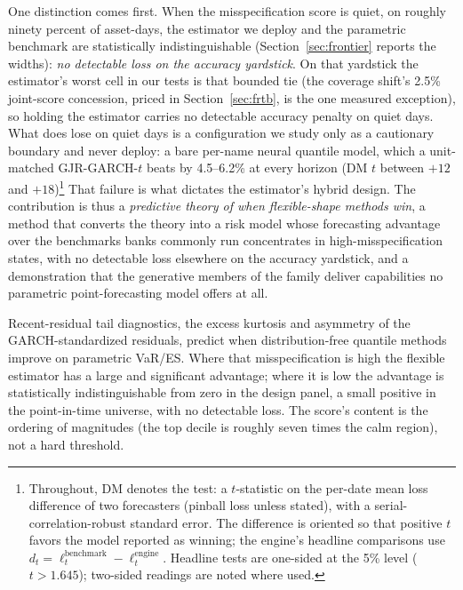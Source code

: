 \documentclass[11pt]{article}
\theoremstyle{remark}
\begin{document}
One distinction comes first. When the misspecification score is quiet, on
roughly ninety percent of asset-days, the estimator we deploy and the
parametric benchmark are statistically indistinguishable
(Section~\ref{sec:frontier} reports the widths): \emph{no
detectable loss on the accuracy yardstick}. On that yardstick the
estimator's worst cell in our tests is that bounded tie (the coverage
shift's 2.5\% joint-score concession, priced in
Section~\ref{sec:frtb}, is the one measured exception), so holding the
estimator carries no detectable accuracy penalty on quiet days. What does lose on quiet days is a configuration we study only
as a cautionary boundary and never deploy: a bare per-name neural
quantile model, which a unit-matched GJR-GARCH-$t$ beats by
4.5--6.2\% at every horizon (DM $t$ between $+12$ and
$+18$)\footnote{Throughout, DM denotes the \citet{dieboldmariano1995}
test: a $t$-statistic on the per-date mean loss difference of two
forecasters (pinball loss unless stated), with a serial-correlation-robust
standard error. The difference is oriented so that positive $t$ favors
the model reported as winning; the engine's headline comparisons use
$d_t=\ell_t^{\text{benchmark}}-\ell_t^{\text{engine}}$. Headline tests
are one-sided at the 5\% level ($t>1.645$); two-sided readings are
noted where used.} That failure is what dictates the estimator's hybrid design. The
contribution is thus a \emph{predictive theory of when flexible-shape
methods win}, a method that converts the theory into a risk model
whose forecasting advantage over the benchmarks banks commonly run
concentrates in high-misspecification states, with no detectable loss
elsewhere on the accuracy yardstick, and a demonstration that the generative members of the
family deliver capabilities no parametric point-forecasting model
offers at all.

Recent-residual tail diagnostics, the excess kurtosis and asymmetry of
the GARCH-standardized residuals, predict when distribution-free
quantile methods improve on parametric VaR/ES. Where
that misspecification is high the flexible estimator has a large and
significant advantage; where it is low the advantage is
statistically indistinguishable from zero in the design panel, a small
positive in the point-in-time universe, with no detectable loss. The
score's content is the ordering of magnitudes (the top decile is
roughly seven times the calm region), not a hard threshold.
\end{document}
